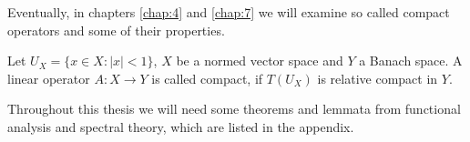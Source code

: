 Eventually, in chapters \ref{chap:4} and \ref{chap:7} we will examine so called compact operators and some of their properties.

\begin{definition}
	Let $U_{X} = \{ x \in X \colon |x| < 1 \}$, $X$ be a normed vector space and $Y$ a Banach space. A linear operator $A \colon X \rightarrow Y$ is called compact, if $T(U_{X})$ is relative compact in $Y$.
\end{definition}

Throughout this thesis we will need some theorems and lemmata from functional analysis and spectral theory, which are listed in the appendix.